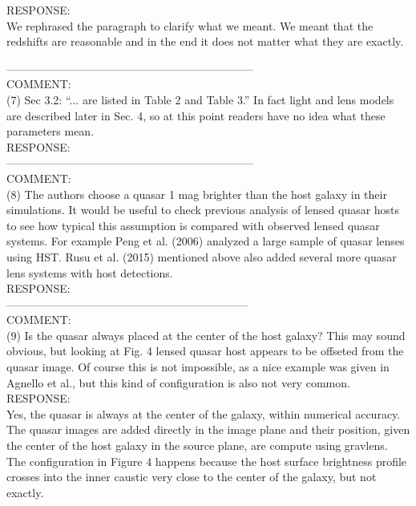 \documentclass[a4paper,11pt]{article}
\begin{document}
RESPONSE:
\\
We rephrased the paragraph to clarify what we meant. We meant that the
redshifts are reasonable and in the end it does not matter what they
are exactly.

------------------------------------------------------------------
\\
COMMENT:
\\
(7) Sec 3.2: ``... are listed in Table 2 and Table 3.'' In fact light and lens models are described later in Sec. 4, so at this point readers have no idea what these parameters mean.
\\

RESPONSE:
\\

------------------------------------------------------------------
\\
COMMENT:
\\
(8) The authors choose a quasar 1 mag brighter than the host galaxy in their simulations. It would be useful to check previous analysis of lensed quasar hosts to see how typical this assumption is compared with observed lensed quasar systems. For example Peng et al. (2006) analyzed a large sample of quasar lenses using HST. Rusu et al. (2015) mentioned above also added several more quasar lens systems with host detections.
\\

RESPONSE:
\\

-----------------------------------------------------------------
\\
COMMENT:
\\
(9) Is the quasar always placed at the center of the host galaxy? This may sound obvious, but looking at Fig. 4 lensed quasar host appears to be offseted from the quasar image. Of course this is not impossible, as a nice example was given in Agnello et al., but this kind of configuration is also not very common.
\\

RESPONSE:
\\
Yes, the quasar is always at the center of the galaxy, within numerical accuracy. The quasar images are added directly in the image plane and their position, given the center of the host galaxy in the source plane, are compute using gravlens. The configuration in Figure 4 happens because the host surface brightness profile crosses into the inner caustic very close to the center of the galaxy, but not exactly.
\end{document}
